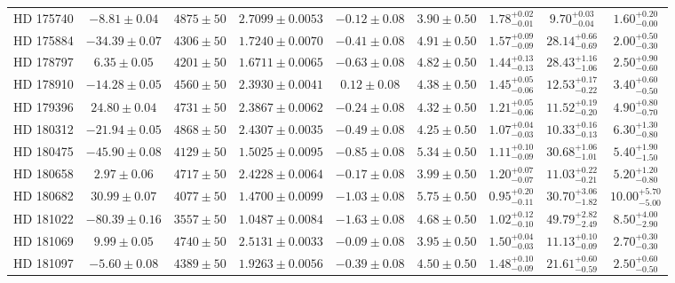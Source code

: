 \begin{table*}
\begin{tabular}{ccccccccc}
HD 175740 & $-8.81 \pm 0.04$ & $4875 \pm 50$ & $2.7099 \pm 0.0053$ & $-0.12 \pm 0.08$ & $3.90 \pm 0.50$ & $1.78^{+0.02}_{-0.01}$ & $9.70^{+0.03}_{-0.04}$ & $1.60^{+0.20}_{-0.00}$ \\
HD 175884 & $-34.39 \pm 0.07$ & $4306 \pm 50$ & $1.7240 \pm 0.0070$ & $-0.41 \pm 0.08$ & $4.91 \pm 0.50$ & $1.57^{+0.09}_{-0.09}$ & $28.14^{+0.66}_{-0.69}$ & $2.00^{+0.50}_{-0.30}$ \\
HD 178797 & $6.35 \pm 0.05$ & $4201 \pm 50$ & $1.6711 \pm 0.0065$ & $-0.63 \pm 0.08$ & $4.82 \pm 0.50$ & $1.44^{+0.13}_{-0.13}$ & $28.43^{+1.16}_{-1.06}$ & $2.50^{+0.90}_{-0.60}$ \\
HD 178910 & $-14.28 \pm 0.05$ & $4560 \pm 50$ & $2.3930 \pm 0.0041$ & $0.12 \pm 0.08$ & $4.38 \pm 0.50$ & $1.45^{+0.05}_{-0.06}$ & $12.53^{+0.17}_{-0.22}$ & $3.40^{+0.60}_{-0.50}$ \\
HD 179396 & $24.80 \pm 0.04$ & $4731 \pm 50$ & $2.3867 \pm 0.0062$ & $-0.24 \pm 0.08$ & $4.32 \pm 0.50$ & $1.21^{+0.05}_{-0.06}$ & $11.52^{+0.19}_{-0.20}$ & $4.90^{+0.80}_{-0.70}$ \\
HD 180312 & $-21.94 \pm 0.05$ & $4868 \pm 50$ & $2.4307 \pm 0.0035$ & $-0.49 \pm 0.08$ & $4.25 \pm 0.50$ & $1.07^{+0.04}_{-0.03}$ & $10.33^{+0.16}_{-0.13}$ & $6.30^{+1.30}_{-0.80}$ \\
HD 180475 & $-45.90 \pm 0.08$ & $4129 \pm 50$ & $1.5025 \pm 0.0095$ & $-0.85 \pm 0.08$ & $5.34 \pm 0.50$ & $1.11^{+0.10}_{-0.09}$ & $30.68^{+1.06}_{-1.01}$ & $5.40^{+1.90}_{-1.50}$ \\
HD 180658 & $2.97 \pm 0.06$ & $4717 \pm 50$ & $2.4228 \pm 0.0064$ & $-0.17 \pm 0.08$ & $3.99 \pm 0.50$ & $1.20^{+0.07}_{-0.07}$ & $11.03^{+0.22}_{-0.21}$ & $5.20^{+1.20}_{-0.80}$ \\
HD 180682 & $30.99 \pm 0.07$ & $4077 \pm 50$ & $1.4700 \pm 0.0099$ & $-1.03 \pm 0.08$ & $5.75 \pm 0.50$ & $0.95^{+0.20}_{-0.11}$ & $30.70^{+3.06}_{-1.82}$ & $10.00^{+5.70}_{-5.00}$ \\
HD 181022 & $-80.39 \pm 0.16$ & $3557 \pm 50$ & $1.0487 \pm 0.0084$ & $-1.63 \pm 0.08$ & $4.68 \pm 0.50$ & $1.02^{+0.12}_{-0.10}$ & $49.79^{+2.82}_{-2.49}$ & $8.50^{+4.00}_{-2.90}$ \\
HD 181069 & $9.99 \pm 0.05$ & $4740 \pm 50$ & $2.5131 \pm 0.0033$ & $-0.09 \pm 0.08$ & $3.95 \pm 0.50$ & $1.50^{+0.04}_{-0.03}$ & $11.13^{+0.10}_{-0.09}$ & $2.70^{+0.30}_{-0.30}$ \\
HD 181097 & $-5.60 \pm 0.08$ & $4389 \pm 50$ & $1.9263 \pm 0.0056$ & $-0.39 \pm 0.08$ & $4.50 \pm 0.50$ & $1.48^{+0.10}_{-0.09}$ & $21.61^{+0.60}_{-0.59}$ & $2.50^{+0.60}_{-0.50}$ \\

\end{tabular}
\end{table*}
